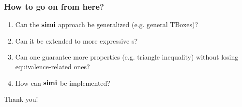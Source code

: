\documentclass[smaller]{beamer}
\begin{document}
\begin{frame}
  \frametitle{How to go on from here?}
  \begin{enumerate}[<+->]
    \item Can the \(\operatorname{\mathbf{simi}}\) approach be generalized
    (e.g. general TBoxes)?
    \item Can it be extended to
    more expressive \dl{}s?
    \item Can one guarantee more properties
    (e.g. triangle inequality) without losing
    equivalence-related ones?
    \item How can \(\operatorname{\mathbf{simi}}\) be implemented?
  \end{enumerate}
\end{frame}

\begin{frame}[standout]
  Thank you!
\end{frame}
%
%
\end{document}
